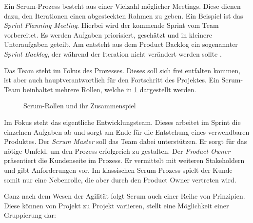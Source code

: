 Ein Scrum-Prozess besteht aus einer Vielzahl möglicher Meetings. Diese dienen dazu, den Iterationen einen abgesteckten Rahmen zu geben. Ein Beispiel ist das \textit{Sprint Planning Meeting}. Hierbei wird der kommende Sprint vom Team vorbereitet. Es werden Aufgaben priorisiert, geschätzt und in kleinere Unteraufgaben geteilt. Am entsteht aus dem Product Backlog ein sogenannter \textit{Sprint Backlog}, der während der Iteration nicht verändert werden sollte \cite[S. 29]{wirdemann_scrum_2017}.

Das Team steht im Fokus des Prozesses. Dieses soll sich frei entfalten kommen, ist aber auch hauptverantwortlich für den Fortschritt des Projektes. Ein Scrum-Team beinhaltet mehrere Rollen, welche in \ref{fig:scrumrollen} dargestellt werden. 

\begin{figure}[H]
	\centering
	\caption[Scrum-Rollen und ihr Zusammenspiel]{Scrum-Rollen und ihr Zusammenspiel \protect \cite[S. 36]{wirdemann_scrum_2017}}
	\label{fig:scrumrollen}
\end{figure}

Im Fokus steht das eigentliche Entwicklungsteam. Dieses arbeitet im Sprint die einzelnen Aufgaben ab und sorgt am Ende für die Entstehung eines verwendbaren Produktes. Der \textit{Scrum Master} soll das Team dabei unterstützen. Er sorgt für das nötige Umfeld, um den Prozess erfolgreich zu gestalten. Der \textit{Product Owner} präsentiert die Kundenseite im Prozess. Er vermittelt mit weiteren Stakeholdern und gibt Anforderungen vor. Im klassischen Scrum-Prozess spielt der Kunde somit nur eine Nebenrolle, die aber durch den Product Owner vertreten wird. 

Ganz nach dem Wesen der Agilität folgt Scrum auch einer  Reihe von Prinzipien. Diese können von Projekt zu Projekt variieren,  stellt eine Möglichkeit einer Gruppierung dar:

